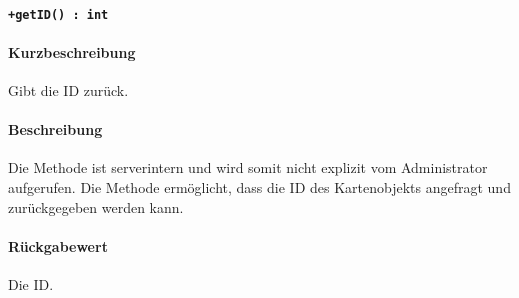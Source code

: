 \paragraph*{\texttt{+getID() : int}}%
\paragraph*{Kurzbeschreibung}
Gibt die ID zurück.
\paragraph*{Beschreibung}
Die Methode ist serverintern und wird somit nicht explizit vom Administrator aufgerufen.
Die Methode ermöglicht, dass die ID des Kartenobjekts angefragt und zurückgegeben werden kann.
\paragraph*{Rückgabewert}
Die ID.
